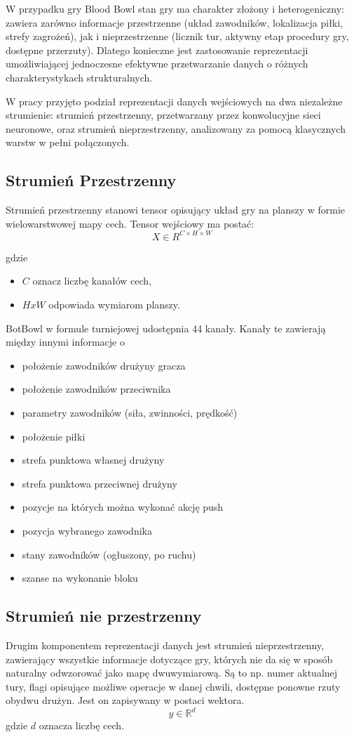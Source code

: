 W przypadku gry Blood Bowl stan gry ma charakter złożony i heterogeniczny: zawiera zarówno informacje przestrzenne (układ zawodników, lokalizacja piłki, strefy zagrożeń), jak i nieprzestrzenne (licznik tur, aktywny etap procedury gry, dostępne przerzuty). Dlatego konieczne jest zastosowanie reprezentacji umożliwiającej jednoczesne efektywne przetwarzanie danych o różnych charakterystykach strukturalnych.

W pracy przyjęto podział reprezentacji danych wejściowych na dwa niezależne strumienie: strumień przestrzenny, przetwarzany przez konwolucyjne sieci neuronowe, oraz strumień nieprzestrzenny, analizowany za pomocą klasycznych warstw w pełni połączonych.

\subsection*{Strumień Przestrzenny}
Strumień przestrzenny stanowi tensor opisujący układ gry na planszy w formie wielowarstwowej mapy cech. Tensor wejściowy ma postać:
\[X \in R^{C \times H \times W}\]

gdzie
\begin{itemize}
	\item $C$ oznacz liczbę kanałów cech,
	\item $HxW$ odpowiada wymiarom planszy.
\end{itemize}

BotBowl w formule turniejowej udostępnia 44 kanały. Kanały te zawierają między innymi informacje o 
\begin{itemize}
	\item położenie zawodników drużyny gracza
	\item położenie zawodników przeciwnika
	\item parametry zawodników (siła, zwinności, prędkość)
	\item położenie piłki
	\item strefa punktowa własnej drużyny
	\item strefa punktowa przeciwnej drużyny
	\item pozycje na których można wykonać akcję push
	\item pozycja wybranego zawodnika
	\item stany zawodników (ogłuszony, po ruchu)
	\item szanse na wykonanie bloku
\end{itemize}

\subsection*{Strumień nie przestrzenny}
Drugim komponentem reprezentacji danych jest strumień nieprzestrzenny, zawierający wszystkie informacje dotyczące gry, których nie da się w sposób naturalny odwzorować jako mapę dwuwymiarową. Są to np. numer aktualnej tury, flagi opisujące możliwe operacje w danej chwili, dostępne ponowne rzuty obydwu drużyn. Jest on zapisywany w postaci wektora.
\[ y \in \mathbb{R}^d\]
gdzie $d$ oznacza liczbę cech.

